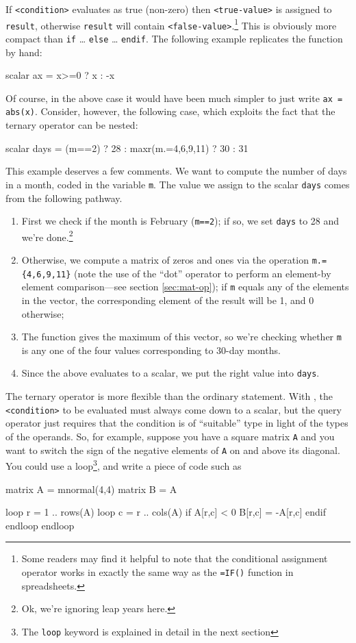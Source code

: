 If \texttt{<condition>} evaluates as true (non-zero) then
\texttt{<true-value>} is assigned to \texttt{result}, otherwise
\texttt{result} will contain \texttt{<false-value>}.\footnote{Some
  readers may find it helpful to note that the conditional assignment
  operator works in exactly the same way as the \texttt{=IF()} function
  in spreadsheets.}  This is obviously more compact than \texttt{if}
\dots{} \texttt{else} \dots{} \texttt{endif}. The following example
replicates the  function by hand:
\begin{code}
scalar ax = x>=0 ? x : -x
\end{code}
Of course, in the above case it would have been much simpler to just
write \texttt{ax = abs(x)}. Consider, however, the following case,
which exploits the fact that the ternary operator can be nested:
\begin{code}
scalar days = (m==2) ? 28 : maxr(m.={4,6,9,11}) ? 30 : 31
\end{code}
This example deserves a few comments. We want to compute the number of
days in a month, coded in the variable \texttt{m}. The value we assign
to the scalar \texttt{days} comes from the following pathway.
\begin{enumerate}
\item First we check if the month is February (\texttt{m==2}); if so,
  we set \texttt{days} to 28 and we're done.\footnote{Ok, we're ignoring
    leap years here.}
\item Otherwise, we compute a matrix of zeros and ones via the
  operation \verb|m.={4,6,9,11}| (note the use of the ``dot'' operator
  to perform an element-by element comparison---see section
  \ref{sec:mat-op}); if \texttt{m} equals any of the elements in the
  vector, the corresponding element of the result will be 1, and
  0 otherwise;
\item The  function gives the maximum of this vector, so
  we're checking whether \texttt{m} is any one of the four values
  corresponding to 30-day months.
\item Since the above evaluates to a scalar, we put the right value
  into \texttt{days}.
\end{enumerate}

The ternary operator is more flexible than the ordinary 
statement. With , the \texttt{<condition>} to be evaluated
must always come down to a scalar, but the query operator just
requires that the condition is of ``suitable'' type in light of the
types of the operands.  So, for example, suppose you have a square
matrix \texttt{A} and you want to switch the sign of the negative
elements of \texttt{A} on and above its diagonal. You could use a
loop\footnote{The \texttt{loop} keyword is explained in detail in the
  next section}, and write a piece of code such as
\begin{code}
matrix A = mnormal(4,4)
matrix B = A

loop r = 1 .. rows(A)
  loop c = r .. cols(A)
     if A[r,c] < 0
       B[r,c] = -A[r,c]
     endif
  endloop
endloop
\end{code}

